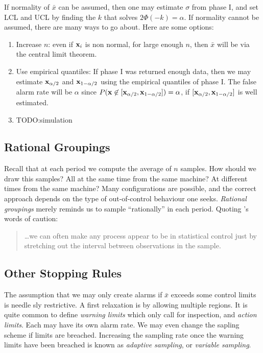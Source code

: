 If normality of $\bar{x}$ can be assumed, then one may estimate $\sigma$ from phase I, and set LCL and UCL by finding the $k$ that solves $2\Phi(-k)=\alpha$.
If normality cannot be assumed, there are many ways to go about. Here are some options:
\begin{enumerate}
\item Increase $n$: even if $\mathbf{x}_i$ is non normal, for large enough $n$, then $\bar{x}$ will be via the central limit theorem.
\item Use empirical quantiles: If phase I was returned enough data, then we may estimate $\mathbf{x}_{\alpha/2}$ and $\mathbf{x}_{1-\alpha/2}$ using the empirical quantiles of phase I. The false alarm rate will be $\alpha$ since $P(\mathbf{x} \not \in [\mathbf{x}_{\alpha/2},\mathbf{x}_{1-\alpha/2}])=\alpha$, if $[\mathbf{x}_{\alpha/2},\mathbf{x}_{1-\alpha/2}]$ is well estimated.
\item TODO:simulation
\end{enumerate}




\subsection{Rational Groupings}
\label{sec:rational_grouping}
Recall that at each period we compute the average of $n$ samples. 
How should we draw this samples? All at the same time from the same machine?
At different times from the same machine?
Many configurations are possible, and the correct approach depends on the type of out-of-control behaviour one seeks. 
\emph{Rational groupings} merely reminds us to sample ``rationally'' in each period. 
Quoting \cite{montgomery_introduction_2007}'s words of caution:
\begin{quotation}
\dots we can often make any process appear to be in statistical control just by stretching out the interval between observations in the sample.
\end{quotation}






\subsection{Other Stopping Rules}
\label{sec:stopping_rules}

The assumption that we may only create alarms if $\bar{x}$ exceeds some control limits is needle sly restrictive.
A first relaxation is by allowing multiple regions.
It is quite common to define \emph{warning limits} which only call for inspection, and \emph{action limits}. Each may have its own alarm rate.
We may even change the sapling scheme if limits are breached. Increasing the sampling rate once the warning limits have been breached is known as \emph{adaptive sampling}, or \emph{variable sampling}.



